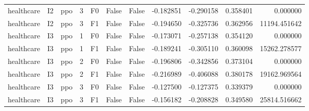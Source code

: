 \begin{tabular}{lllrlllrrrr}
healthcare &      I2 &       ppo &     3 &  F0 &           False &            False & -0.182851 & -0.290158 & 0.358401 &         0.000000 \\
healthcare &      I2 &       ppo &     3 &  F1 &           False &            False & -0.194650 & -0.325736 & 0.362956 &     11194.451642 \\
healthcare &      I3 &       ppo &     1 &  F0 &           False &            False & -0.173071 & -0.257138 & 0.354120 &         0.000000 \\
healthcare &      I3 &       ppo &     1 &  F1 &           False &            False & -0.189241 & -0.305110 & 0.360098 &     15262.278577 \\
healthcare &      I3 &       ppo &     2 &  F0 &           False &            False & -0.196806 & -0.342856 & 0.373104 &         0.000000 \\
healthcare &      I3 &       ppo &     2 &  F1 &           False &            False & -0.216989 & -0.406088 & 0.380178 &     19162.969564 \\
healthcare &      I3 &       ppo &     3 &  F0 &           False &            False & -0.127500 & -0.127375 & 0.339379 &         0.000000 \\
healthcare &      I3 &       ppo &     3 &  F1 &           False &            False & -0.156182 & -0.208828 & 0.349580 &     25814.516662 \\
\bottomrule
\end{tabular}
